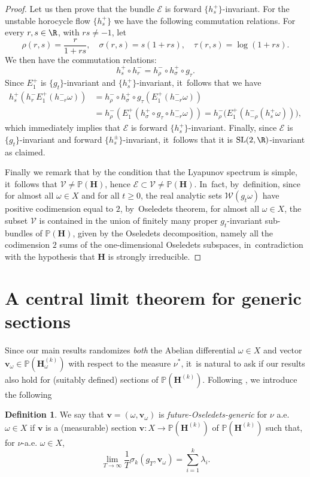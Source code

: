 \documentclass[10pt]{amsart}
\theoremstyle{plain}
\theoremstyle{definition}
\newtheorem{definition}[thm]{Definition}
\numberwithin{equation}{subsection}
\newcommand\bP{\mathbb{P}}
\newcommand\cE{\mathcal{E}}
\newcommand\cV{\mathcal{V}}
\newcommand\cW{\mathcal{W}}
\newcommand{\SL}{\mathrm{SL}}
\newcommand{\bfH}{\boldsymbol{H}}
\newcommand{\bfv}{\boldsymbol{v}}
\begin{document}
\begin{proof}
Let us then prove that the bundle $\cE$ is forward $\{h^+_s\}$-invariant. For the unstable horocycle flow $\{h^+_s\}$ we have the following commutation relations. For every $r, s \in \R$, with $rs\not=-1$, let
\[
\rho(r,s) = \frac{r}{1+rs}, \quad \sigma(r,s) = s(1+rs), \quad \tau(r,s)= \log (1+rs).
\]
We then have the commutation relations:
\[
h^+_s \circ h^-_{r} = h^-_\rho \circ h^+_\sigma \circ g_\tau.
\]
Since $E^+_1$ is $\{g_t\}$-invariant and $\{h^+_s\}$-invariant, it~follows that we have
\[
\begin{aligned}
h^+_s \left(h^-_r E^+_1(h^-_{-r} \omega)\right) & = h^-_\rho \circ h^+_\sigma \circ g_\tau \left(E^+_1(h^-_{-r} \omega)\right) \\ & =
h^-_\rho \left(E^+_1(h^+_\sigma \circ g_\tau \circ h^-_{-r} \omega)\right)
= h^-_\rho \bigl(E^+_1(h^-_{-\rho} (h^+_s \omega)) \bigr),
\end{aligned}
\]
which immediately implies that $\cE$ is
forward $\{h^+_s\}$-invariant. Finally, since
$\cE$ is $\{g_t\}$-invariant and forward
$\{h^\pm_s\}$-invariant, it~follows that it is
$\SL(2, \R)$-invariant as claimed.

Finally we remark that by the condition that the Lyapunov spectrum is simple, it~follows that $\cV \not =\bP(\bfH)$, hence $\cE \subset \cV \not = \bP(\bfH)$. In~fact, by~definition, since for almost all $\omega \in X$ and for all $t \geq 0$, the real analytic sets $\cW (g_t \omega)$ have positive codimension equal to $2$, by~Oseledets theorem, for almost all $\omega \in X$, the subset $\cV$ is contained in the union of finitely many proper $g_t$-invariant sub-bundles of $\bP ({\bfH})$, given by the Oseledets decomposition, namely all the codimension $2$ sums of the one-dimensional Oseledets subspaces, in~contradiction with the hypothesis that $\bfH$ is strongly irreducible.
\end{proof}

\section{A central limit theorem for generic sections}\label{sectionsclt}
Since our main results randomizes \emph{both} the Abelian differential $\omega\in X$ and vector $\bfv_\omega\in
\bP(\bfH_\omega^{(k)})$ with respect to the measure $\nu^*$, it~is natural to ask if our results also hold for (suitably defined) sections of $\bP(\bfH^{(k)})$. Following \cite{AF24}, we introduce the following

\begin{definition}\label{fut-gen}
We say that $\bfv=(\omega,\bfv_{\omega})$ is \emph{future-Oseledets-generic} for $\nu$ a.e. $\omega\in X$ if $\bfv$ is a (measurable) section $\bfv:X \to \bP(\bfH^{(k)})$ of $\bP(\bfH^{(k)})$ such that, for $\nu$-a.e. $\omega \in X$,
\[
\lim_{T\to\infty} \frac{1}{T} \sigma_k(g_{T}, \bfv_\omega) = \sum_{i=1}^k \lambda_i.
\]
\end{definition}
\end{document}
